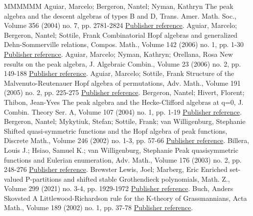 \begin{thebibliography}{MMMMMM}
 Aguiar, Marcelo; Bergeron, Nantel; Nyman, Kathryn The peak algebra and the descent algebras of types B and D, Trans. Amer. Math. Soc., Volume 356 (2004) no. 7, pp. 2781-2824 \href{https://alco.centre-mersenne.org/articles/10.5802/alco.362/#AguiarBergeronNyman}{Publisher reference}.
 Aguiar, Marcelo; Bergeron, Nantel; Sottile, Frank Combinatorial Hopf algebras and generalized Dehn-Sommerville relations, Compos. Math., Volume 142 (2006) no. 1, pp. 1-30 \href{https://alco.centre-mersenne.org/articles/10.5802/alco.362/#ABS}{Publisher reference}.
 Aguiar, Marcelo; Nyman, Kathryn; Orellana, Rosa New results on the peak algebra, J. Algebraic Combin., Volume 23 (2006) no. 2, pp. 149-188 \href{https://alco.centre-mersenne.org/articles/10.5802/alco.362/#AguiarNymanOrellana}{Publisher reference}.
 Aguiar, Marcelo; Sottile, Frank Structure of the Malvenuto-Reutenauer Hopf algebra of permutations, Adv. Math., Volume 191 (2005) no. 2, pp. 225-275 \href{https://alco.centre-mersenne.org/articles/10.5802/alco.362/#AguiarSottile}{Publisher reference}.
 Bergeron, Nantel; Hivert, Florent; Thibon, Jean-Yves The peak algebra and the Hecke-Clifford algebras at q=0, J. Combin. Theory Ser. A, Volume 107 (2004) no. 1, pp. 1-19 \href{https://alco.centre-mersenne.org/articles/10.5802/alco.362/#BergeronHivertThibon}{Publisher reference}.
 Bergeron, Nantel; Mykytiuk, Stefan; Sottile, Frank; van Willigenburg, Stephanie Shifted quasi-symmetric functions and the Hopf algebra of peak functions, Discrete Math., Volume 246 (2002) no. 1-3, pp. 57-66 \href{https://alco.centre-mersenne.org/articles/10.5802/alco.362/#BMSW}{Publisher reference}.
 Billera, Louis J.; Hsiao, Samuel K.; van Willigenburg, Stephanie Peak quasisymmetric functions and Eulerian enumeration, Adv. Math., Volume 176 (2003) no. 2, pp. 248-276 \href{https://alco.centre-mersenne.org/articles/10.5802/alco.362/#BilleraHsiaoWill}{Publisher reference}.
 Brewster Lewis, Joel; Marberg, Eric Enriched set-valued P-partitions and shifted stable Grothendieck polynomials, Math. Z., Volume 299 (2021) no. 3-4, pp. 1929-1972 \href{https://alco.centre-mersenne.org/articles/10.5802/alco.362/#LM2019}{Publisher reference}.
 Buch, Anders Skovsted A Littlewood-Richardson rule for the K-theory of Grassmannians, Acta Math., Volume 189 (2002) no. 1, pp. 37-78 \href{https://alco.centre-mersenne.org/articles/10.5802/alco.362/#Buch2002}{Publisher reference}.

\end{thebibliography}
